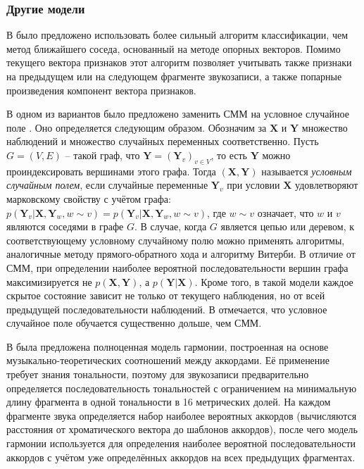 \subsubsection{Другие модели}

В \cite{Weller2009} было предложено использовать более сильный алгоритм
классификации, чем метод ближайшего соседа, основанный на методе опорных
векторов. Помимо текущего вектора признаков этот алгоритм позволяет учитывать
также признаки на предыдущем или на следующем фрагменте звукозаписи, а также
попарные произведения компонент вектора признаков.

В одном из вариантов \cite{Burgoyne2007} было предложено заменить СММ на
условное случайное поле \cite{Lafferty2001}. Оно определяется следующим образом.
Обозначим за $\boldsymbol{X}$ и $\boldsymbol{Y}$ множество наблюдений и
множество случайных переменных соответственно. Пусть $G = (V, E)$ -- такой граф,
что $\boldsymbol{Y} = (\boldsymbol{Y}_v)_{v \in V}$, то есть $\boldsymbol{Y}$
можно проиндексировать вершинами этого графа. Тогда $(\boldsymbol{X},
\boldsymbol{Y})$ называется \emph{условным случайным полем}, если случайные
переменные $\boldsymbol{Y}_v$ при условии $\boldsymbol{X}$ удовлетворяют
марковскому свойству с учётом графа: $p(\boldsymbol{Y}_v | \boldsymbol{X},
\boldsymbol{Y}_w, w \sim v) = p(\boldsymbol{Y}_v | \boldsymbol{X},
\boldsymbol{Y}_w, w \sim v)$, где $w \sim v$ означает, что $w$ и $v$ являются
соседями в графе $G$. В случае, когда $G$ является цепью или деревом, к
соответствующему условному случайному полю можно применять алгоритмы,
аналогичные методу прямого-обратного хода и алгоритму Витерби. В отличие от СММ,
при определении наиболее вероятной последовательности вершин графа
максимизируется не $p(\boldsymbol{X}, \boldsymbol{Y})$, а $p(\boldsymbol{Y} |
\boldsymbol{X})$. Кроме того, в такой модели каждое скрытое состояние зависит не
только от текущего наблюдения, но от всей предыдущей последовательности
наблюдений. В \cite{Burgoyne2007} отмечается, что условное случайное поле
обучается существенно дольше, чем СММ.

В \cite{DeHaas2012} была предложена полноценная модель гармонии, построенная на
основе музыкально-теоретических соотношений между аккордами. Её применение
требует знания тональности, поэтому для звукозаписи предварительно определяется
последовательность тональностей с ограничением на минимальную длину фрагмента в
одной тональности в 16 метрических долей. На каждом фрагменте звука определяется
набор наиболее вероятных аккордов (вычисляются расстояния от хроматического
вектора до шаблонов аккордов), после чего модель гармонии используется для
определения наиболее вероятной последовательности аккордов с учётом уже
определённых аккордов на всех предыдущих фрагментах.

